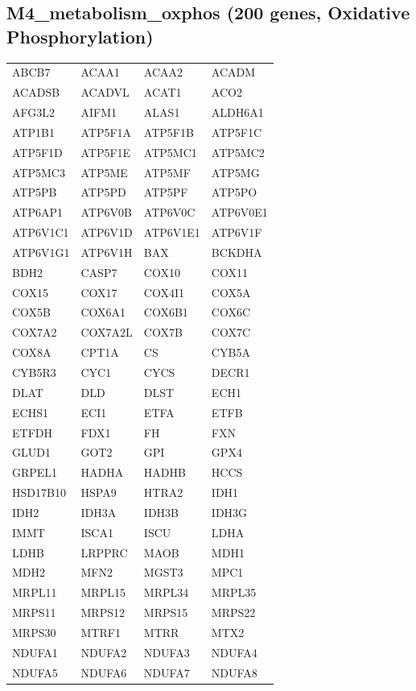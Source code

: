 \subsection*{M4\_metabolism\_oxphos (200 genes, Oxidative Phosphorylation)}
\begin{longtable}{llll}
ABCB7 & ACAA1 & ACAA2 & ACADM \\
ACADSB & ACADVL & ACAT1 & ACO2 \\
AFG3L2 & AIFM1 & ALAS1 & ALDH6A1 \\
ATP1B1 & ATP5F1A & ATP5F1B & ATP5F1C \\
ATP5F1D & ATP5F1E & ATP5MC1 & ATP5MC2 \\
ATP5MC3 & ATP5ME & ATP5MF & ATP5MG \\
ATP5PB & ATP5PD & ATP5PF & ATP5PO \\
ATP6AP1 & ATP6V0B & ATP6V0C & ATP6V0E1 \\
ATP6V1C1 & ATP6V1D & ATP6V1E1 & ATP6V1F \\
ATP6V1G1 & ATP6V1H & BAX & BCKDHA \\
BDH2 & CASP7 & COX10 & COX11 \\
COX15 & COX17 & COX4I1 & COX5A \\
COX5B & COX6A1 & COX6B1 & COX6C \\
COX7A2 & COX7A2L & COX7B & COX7C \\
COX8A & CPT1A & CS & CYB5A \\
CYB5R3 & CYC1 & CYCS & DECR1 \\
DLAT & DLD & DLST & ECH1 \\
ECHS1 & ECI1 & ETFA & ETFB \\
ETFDH & FDX1 & FH & FXN \\
GLUD1 & GOT2 & GPI & GPX4 \\
GRPEL1 & HADHA & HADHB & HCCS \\
HSD17B10 & HSPA9 & HTRA2 & IDH1 \\
IDH2 & IDH3A & IDH3B & IDH3G \\
IMMT & ISCA1 & ISCU & LDHA \\
LDHB & LRPPRC & MAOB & MDH1 \\
MDH2 & MFN2 & MGST3 & MPC1 \\
MRPL11 & MRPL15 & MRPL34 & MRPL35 \\
MRPS11 & MRPS12 & MRPS15 & MRPS22 \\
MRPS30 & MTRF1 & MTRR & MTX2 \\
NDUFA1 & NDUFA2 & NDUFA3 & NDUFA4 \\
NDUFA5 & NDUFA6 & NDUFA7 & NDUFA8 \\

\end{longtable}
